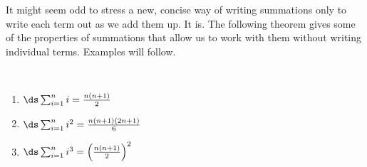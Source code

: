 It might seem odd to stress a new, concise way of writing summations only to write each term out as we add them up. It is. The following theorem gives some of the properties of summations that allow us to work with them without writing individual terms. Examples will follow.

\setboxwidth{75pt}
{~\\[-\baselineskip]\noindent\begin{minipage}[t]{200pt}
\iflatexml{}
\end{minipage}%
\begin{minipage}[t]{150pt}
\begin{enumerate}[resume=summationprop]
\fi
	\item	$\ds \sum_{i=1}^n i = \frac{n(n+1)}2$
	\item	$\ds \sum_{i=1}^n i^2 = \frac{n(n+1)(2n+1)}6$
	\item	$\ds \sum_{i=1}^n i^3 = \left(\frac{n(n+1)}2\right)^2$
	\end{enumerate}
\end{minipage}}

